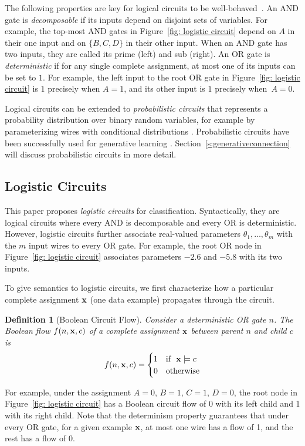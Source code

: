 \documentclass[letterpaper]{article} %
\newtheorem{definition}{Definition}
\begin{document}
The following properties are key for logical circuits to be well-behaved~\cite{darwicheJAIR02}.
An AND gate is \emph{decomposable} if its inputs depend on disjoint sets of variables.
For example, the top-most AND gates in Figure~\ref{fig: logistic circuit} depend on $A$ in their one input and on $\{B,C,D\}$ in their other input.
When an AND gate has two inputs, they are called its prime (left) and sub (right).
An OR gate is \emph{deterministic} if for any single complete assignment, at most one of its inputs can be set to $1$. For example, the left input to the root OR gate  in Figure~\ref{fig: logistic circuit} is $1$ precisely when $A=1$, and its other input is $1$ precisely when~$A=0$.


Logical circuits can be extended to \textit{probabilistic circuits} that represents a probability distribution over binary random variables, for example by parameterizing wires with conditional distributions \cite{KisaVCD14}.
Probabilistic circuits have been successfully used for generative learning \cite{Liang2017}. Section~\ref{s:generativeconnection} will discuss probabilistic circuits in more detail.

\subsection{Logistic Circuits}
\label{s: logistic circuits}
This paper proposes \emph{logistic circuits} for classification. Syntactically, they are logical circuits where every AND is decomposable and every OR is deterministic.
However, logistic circuits further associate real-valued parameters $\theta_1, \dots, \theta_m$ with the $m$ input wires to every OR gate. For example, the root OR node in Figure~\ref{fig: logistic circuit} associates parameters $-2.6$ and $-5.8$ with its two inputs.

To give semantics to logistic circuits, we first characterize how a particular complete assignment $\bf x$ (one data example) propagates through the circuit.

\begin{definition}[Boolean Circuit Flow]
\label{definition: circuit flow}
Consider a deterministic OR gate $n$.
The Boolean flow $f(n,{\bf x},c)$ of a complete assignment $\bf x$ between parent $n$ and child $c$ is
\begin{align*}
    f(n,{\bf x},c) = \begin{cases}
    1 &\mbox{if~~} {\bf x} \models c \\
    0 & \mbox{otherwise}
    \end{cases}
\end{align*}
\end{definition}
For example, under the assignment $A=0$, $B=1$, $C=1$, $D=0$, the root node in Figure~\ref{fig: logistic circuit} has a Boolean circuit flow of 0 with its left child and 1 with its right child.
Note that the determinism property guarantees that under every OR gate, for a given example ${\bf x}$, at most one wire has a flow of 1, and the rest has a flow of $0$.
\end{document}

